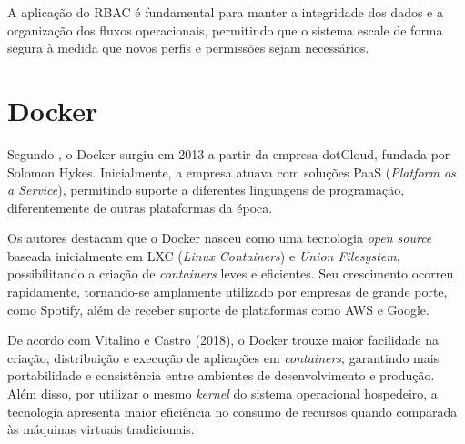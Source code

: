A aplicação do RBAC é fundamental para manter a integridade dos dados e a organização dos fluxos operacionais, permitindo que o sistema escale de forma segura à medida que novos perfis e permissões sejam necessários.




\section{Docker}
Segundo , o Docker surgiu em 2013 a partir da empresa dotCloud, fundada por Solomon Hykes. Inicialmente, a empresa atuava com soluções PaaS (\textit{Platform as a Service}), permitindo suporte a diferentes linguagens de programação, diferentemente de outras plataformas da época.

Os autores destacam que o Docker nasceu como uma tecnologia \textit{open source} baseada inicialmente em LXC (\textit{Linux Containers}) e \textit{Union Filesystem}, possibilitando a criação de \textit{containers} leves e eficientes. Seu crescimento ocorreu rapidamente, tornando-se amplamente utilizado por empresas de grande porte, como Spotify, além de receber suporte de plataformas como AWS e Google.

De acordo com Vitalino e Castro (2018), o Docker trouxe maior facilidade na criação, distribuição e execução de aplicações em \textit{containers}, garantindo mais portabilidade e consistência entre ambientes de desenvolvimento e produção. Além disso, por utilizar o mesmo \textit{kernel} do sistema operacional hospedeiro, a tecnologia apresenta maior eficiência no consumo de recursos quando comparada às máquinas virtuais tradicionais.

